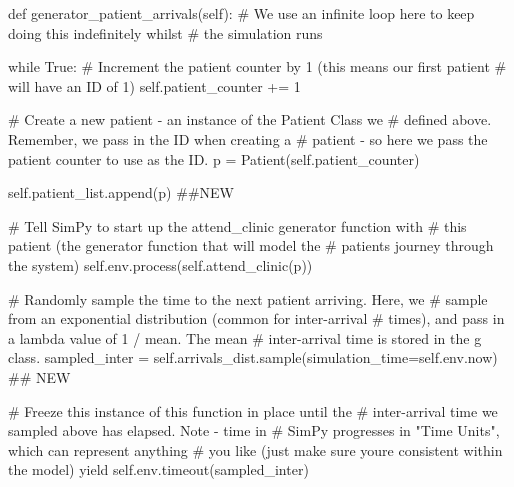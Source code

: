\documentclass[
  letterpaper,
  DIV=11,
  numbers=noendperiod]{scrreprt}
\newenvironment{Shaded}{}{}
\newcommand{\CommentTok}[1]{\textcolor[rgb]{0.42,0.45,0.49}{#1}}
\newcommand{\ControlFlowTok}[1]{\textcolor[rgb]{0.84,0.23,0.29}{#1}}
\newcommand{\DecValTok}[1]{\textcolor[rgb]{0.00,0.36,0.77}{#1}}
\newcommand{\KeywordTok}[1]{\textcolor[rgb]{0.84,0.23,0.29}{#1}}
\newcommand{\NormalTok}[1]{\textcolor[rgb]{0.14,0.16,0.18}{#1}}
\newcommand{\OperatorTok}[1]{\textcolor[rgb]{0.14,0.16,0.18}{#1}}
\newcommand{\VariableTok}[1]{\textcolor[rgb]{0.89,0.38,0.04}{#1}}
\begin{document}
\begin{Shaded}
\begin{Highlighting}[]
    \KeywordTok{def}\NormalTok{ generator\_patient\_arrivals(}\VariableTok{self}\NormalTok{):}
        \CommentTok{\# We use an infinite loop here to keep doing this indefinitely whilst}
        \CommentTok{\# the simulation runs}

        \ControlFlowTok{while} \VariableTok{True}\NormalTok{:}
            \CommentTok{\# Increment the patient counter by 1 (this means our first patient}
            \CommentTok{\# will have an ID of 1)}
            \VariableTok{self}\NormalTok{.patient\_counter }\OperatorTok{+=} \DecValTok{1}

            \CommentTok{\# Create a new patient {-} an instance of the Patient Class we}
            \CommentTok{\# defined above.  Remember, we pass in the ID when creating a}
            \CommentTok{\# patient {-} so here we pass the patient counter to use as the ID.}
\NormalTok{            p }\OperatorTok{=}\NormalTok{ Patient(}\VariableTok{self}\NormalTok{.patient\_counter)}

            \VariableTok{self}\NormalTok{.patient\_list.append(p) }\CommentTok{\#\#NEW}

            \CommentTok{\# Tell SimPy to start up the attend\_clinic generator function with}
            \CommentTok{\# this patient (the generator function that will model the}
            \CommentTok{\# patient\textquotesingle{}s journey through the system)}
            \VariableTok{self}\NormalTok{.env.process(}\VariableTok{self}\NormalTok{.attend\_clinic(p))}

            \CommentTok{\# Randomly sample the time to the next patient arriving.  Here, we}
            \CommentTok{\# sample from an exponential distribution (common for inter{-}arrival}
            \CommentTok{\# times), and pass in a lambda value of 1 / mean.  The mean}
            \CommentTok{\# inter{-}arrival time is stored in the g class.}
\NormalTok{            sampled\_inter }\OperatorTok{=} \VariableTok{self}\NormalTok{.arrivals\_dist.sample(simulation\_time}\OperatorTok{=}\VariableTok{self}\NormalTok{.env.now) }\CommentTok{\#\# NEW}

            \CommentTok{\# Freeze this instance of this function in place until the}
            \CommentTok{\# inter{-}arrival time we sampled above has elapsed.  Note {-} time in}
            \CommentTok{\# SimPy progresses in "Time Units", which can represent anything}
            \CommentTok{\# you like (just make sure you\textquotesingle{}re consistent within the model)}
            \ControlFlowTok{yield} \VariableTok{self}\NormalTok{.env.timeout(sampled\_inter)}
\end{Highlighting}
\end{Shaded}
\end{document}
